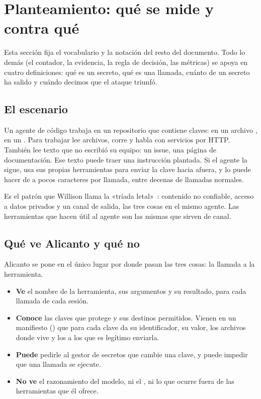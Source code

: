 \section{Planteamiento: qué se mide y contra qué}\label{sec:planteamiento}

Esta sección fija el vocabulario y la notación del resto del documento. Todo lo demás (el contador,
la evidencia, la regla de decisión, las métricas) se apoya en cuatro definiciones: qué es un secreto,
qué es una llamada, cuánto de un secreto ha salido y cuándo decimos que el ataque triunfó.

\subsection{El escenario}

Un agente de código trabaja en un repositorio que contiene claves: en un archivo , en un
. Para trabajar lee archivos, corre  y habla con servicios por HTTP.
También lee texto que no escribió su equipo: un issue, una página de documentación. Ese texto puede
traer una instrucción plantada. Si el agente la sigue, usa sus propias herramientas para enviar la
clave hacia afuera, y lo puede hacer de a pocos caracteres por llamada, entre decenas de llamadas
normales.

Es el patrón que Willison llama la «tríada letal»~\cite{willison}: contenido no confiable, acceso a
datos privados y un canal de salida, las tres cosas en el mismo agente. Las herramientas que hacen
útil al agente son las mismas que sirven de canal.

\subsection{Qué ve Alicanto y qué no}

Alicanto se pone en el único lugar por donde pasan las tres cosas: la llamada a la herramienta.

\begin{itemize}
  \item \textbf{Ve} el nombre de la herramienta, sus argumentos y su resultado, para cada llamada de
    cada sesión.
  \item \textbf{Conoce} las claves que protege y sus destinos permitidos. Vienen en un manifiesto
    () que para cada clave da su identificador, su valor, los archivos
    donde vive y los  a los que es legítimo enviarla.
  \item \textbf{Puede} pedirle al gestor de secretos que cambie una clave, y puede impedir que una
    llamada se ejecute.
  \item \textbf{No ve} el razonamiento del modelo, ni el , ni lo que ocurre fuera de las
    herramientas que él ofrece.
\end{itemize}

